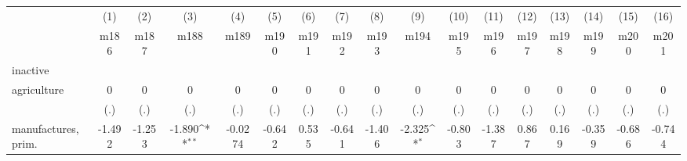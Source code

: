 {
\def\sym#1{\ifmmode^{#1}\else\(^{#1}\)\fi}
\begin{tabular}{l*{16}{c}}
\hline\hline
                    &\multicolumn{1}{c}{(1)}&\multicolumn{1}{c}{(2)}&\multicolumn{1}{c}{(3)}&\multicolumn{1}{c}{(4)}&\multicolumn{1}{c}{(5)}&\multicolumn{1}{c}{(6)}&\multicolumn{1}{c}{(7)}&\multicolumn{1}{c}{(8)}&\multicolumn{1}{c}{(9)}&\multicolumn{1}{c}{(10)}&\multicolumn{1}{c}{(11)}&\multicolumn{1}{c}{(12)}&\multicolumn{1}{c}{(13)}&\multicolumn{1}{c}{(14)}&\multicolumn{1}{c}{(15)}&\multicolumn{1}{c}{(16)}\\
                    &\multicolumn{1}{c}{m186}&\multicolumn{1}{c}{m187}&\multicolumn{1}{c}{m188}&\multicolumn{1}{c}{m189}&\multicolumn{1}{c}{m190}&\multicolumn{1}{c}{m191}&\multicolumn{1}{c}{m192}&\multicolumn{1}{c}{m193}&\multicolumn{1}{c}{m194}&\multicolumn{1}{c}{m195}&\multicolumn{1}{c}{m196}&\multicolumn{1}{c}{m197}&\multicolumn{1}{c}{m198}&\multicolumn{1}{c}{m199}&\multicolumn{1}{c}{m200}&\multicolumn{1}{c}{m201}\\
\hline
inactive            &                     &                     &                     &                     &                     &                     &                     &                     &                     &                     &                     &                     &                     &                     &                     &                     \\
agriculture         &           0         &           0         &           0         &           0         &           0         &           0         &           0         &           0         &           0         &           0         &           0         &           0         &           0         &           0         &           0         &           0         \\
                    &         (.)         &         (.)         &         (.)         &         (.)         &         (.)         &         (.)         &         (.)         &         (.)         &         (.)         &         (.)         &         (.)         &         (.)         &         (.)         &         (.)         &         (.)         &         (.)         \\
[1em]
manufactures, prim. &      -1.492         &      -1.253         &      -1.890\sym{**} &     -0.0274         &      -0.642         &       0.535         &      -0.641         &      -1.406         &      -2.325\sym{*}  &      -0.803         &      -1.387         &       0.867         &       0.169         &      -0.359         &      -0.686         &      -0.744         \\

\end{tabular}}
